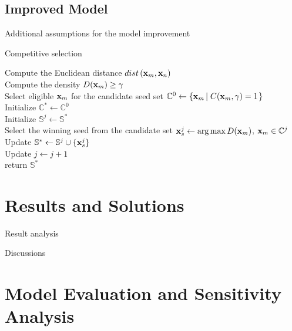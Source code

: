 \documentclass[11pt,a4]{article}
\begin{document}
\subsection{Improved Model}

Additional assumptions for the model improvement


\begin{algorithm}  
    \caption{Competitive selection}  
    \label{CompetitiveSeedSelectionAlgorithm}
    
    Compute the Euclidean distance $dist \left( {\bold{x}_m}, {\bold{x}_n} \right)$ \\  
    Compute the density $D( {\bold{x}_m} ) \ge \gamma$ \\ 
    Select eligible $\bold{x}_m$ for the candidate seed set $\mathbb{C}^0 \gets \left\{  \bold{x}_m \left| \; C( {\bold{x}_m}, \gamma ) = 1\right. \right\}$ \\ 
    Initialize $\mathbb{C}^* \gets \mathbb{C}^0$\\
    { 
      Initialize $\mathbb{S}^j \gets \mathbb{S}^*$ \\
      Select the winning seed from the candidate set $\bold{x}_s^j \gets \mathop {\arg \max } D({\bold{x}_m})$, ${\bold{x}_m} \in \mathbb{C}^j$ \\
      Update $\mathbb{S}^* \gets \mathbb{S}^j \cup \{ \bold{x}_s^j \}$ \\
      Update $j \gets j + 1$ \\
    }
    return $\mathbb{S}^*$ \\
\end{algorithm} 


\section{Results and Solutions}
\label{Results_Solutions}

Result analysis

Discussions



\section{Model Evaluation and Sensitivity Analysis}
\label{ModelEvaluation_SensitivityAnalysis}
\end{document}
